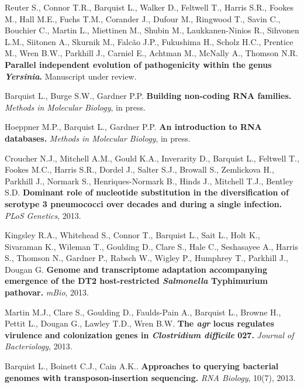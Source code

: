 \item{Reuter S., Connor T.R., Barquist L., Walker D., Feltwell T., Harris S.R., Fookes M., Hall M.E., Fuchs T.M., Corander J., Dufour M., Ringwood T., Savin C., Bouchier C., Martin L., Miettinen M., Shubin M., Laukkanen-Ninios R., Sihvonen L.M., Siitonen A., Skurnik M., Falc\~{a}o J.P., Fukushima H., Scholz H.C., Prentice M., Wren B.W., Parkhill J., Carniel E., Achtman M., McNally A., Thomson N.R. \textbf{Parallel independent evolution of pathogenicity within the genus \textit{Yersinia}.} Manuscript under review.}

\item{Barquist L., Burge S.W., Gardner P.P. \textbf{Building non-coding RNA families.} \textit{Methods in Molecular Biology}, in press.} 

\item{Hoeppner M.P., Barquist L., Gardner P.P. \textbf{An introduction to RNA databases.} \textit{Methods in Molecular Biology}, in press.} 

\item{Croucher N.J., Mitchell A.M., Gould K.A., Inverarity D., Barquist L., Feltwell T., Fookes M.C., Harris S.R., Dordel J., Salter S.J., Browall S., Zemlickova H., Parkhill J., Normark S., Henriques-Normark B., Hinds J., Mitchell T.J., Bentley S.D. \textbf{Dominant role of nucleotide substitution in the diversification of serotype 3 pneumococci over decades and during a single infection.} \textit{PLoS Genetics}, 2013.} 

\item{Kingsley R.A., Whitehead S., Connor T., Barquist L., Sait L., Holt K., Sivaraman K., Wileman T., Goulding D., Clare S., Hale C., Seshasayee A., Harris S., Thomson N., Gardner P., Rabsch W., Wigley P., Humphrey T., Parkhill J., Dougan G. \textbf{Genome and transcriptome adaptation accompanying emergence of the DT2 host-restricted \textit{Salmonella} Typhimurium pathovar.}  \textit{mBio}, 2013.}

\item{Martin M.J., Clare S., Goulding D., Faulds-Pain A., Barquist L., Browne H., Pettit L., Dougan G., Lawley T.D.,  Wren B.W. \textbf{The \textit{agr} locus regulates virulence and colonization genes in \textit{Clostridium difficile} 027.} \textit{Journal of Bacteriology}, 2013. }

\newpage

\item{Barquist L., Boinett C.J., Cain A.K..  \textbf{Approaches to querying bacterial genomes with transposon-insertion sequencing.} \textit{RNA Biology}, 10(7), 2013.}

